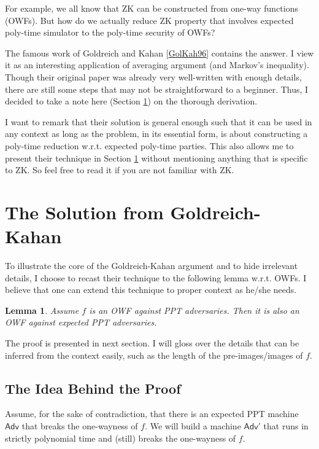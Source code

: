 \documentclass{article}
\newtheorem{lemma}{Lemma}[section]
\newcommand{\Adv}{\mathsf{Adv}}
\begin{document}
For example, we all know that ZK can be constructed from one-way functions (OWFs). But how do we actually reduce ZK property that involves expected poly-time simulator to the poly-time security of OWFs?

The famous work of Goldreich and Kahan [\href{http://www.wisdom.weizmann.ac.il/~oded/PSX/zkAK.pdf}{GolKah96}] contains the answer. I view it as an interesting application of averaging argument (and Markov's inequality). Though their original paper was already very well-written with enough details, there are still some steps that may not be straightforward to a beginner. Thus, I decided to take a note here (Section \ref{section:solution}) on the thorough derivation. 

I want to remark that their solution is general enough such that it can be used in any context as long as the problem, in its essential form, is about constructing a poly-time reduction w.r.t. expected poly-time parties. This also allows me to present their technique in Section \ref{section:solution} without mentioning anything that is specific to ZK. So feel free to read it if you are not familiar with ZK.

\section{The Solution from Goldreich-Kahan}
\label{section:solution}
To illustrate the core of the Goldreich-Kahan argument and to hide irrelevant details, I choose to recast their technique to the following lemma w.r.t. OWFs. I believe that one can extend this technique to proper context as he/she needs.  

\begin{lemma}\label{lemma:the-only-lemma}
Assume $f$ is an OWF against PPT adversaries. Then it is also an OWF against expected PPT adversaries.
\end{lemma}

The proof is presented in next section. I will gloss over the details that can be inferred from the context easily, such as the length of the pre-images/images of $f$.
\subsection{The Idea Behind the Proof}
\label{section:idea-for-proof}
Assume, for the sake of contradiction, that there is an expected PPT machine $\Adv$ that breaks the one-wayness of $f$. We will build a machine $\Adv'$ that runs in strictly polynomial time and (still) breaks the one-wayness of $f$.
\end{document}
